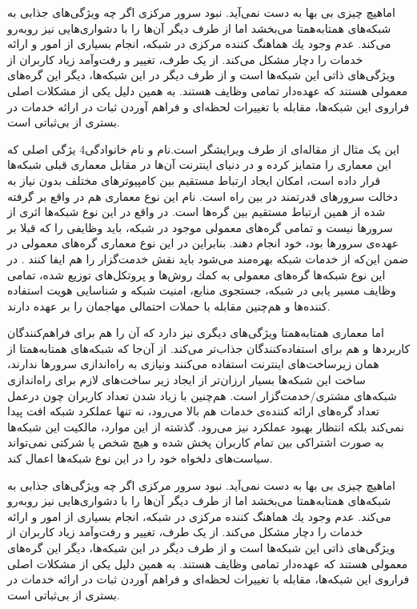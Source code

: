 \documentclass[12pt,twoside]{xepersian-magazine}
\begin{document}
\begin{article}{2}
اماهيچ چيزی بی‌ بها به دست نمی‌آید. نبود سرور مرکزی اگر چه  ويژگی‌های جذابی به شبکه‌های همتابه‌همتا می‌بخشد اما از طرف ديگر آن‌ها را با دشواری‌هايی نيز روبه‌رو می‌کند.  عدم وجود يك هماهنگ كننده مركزی در شبكه، انجام بسياری از امور و ارائه خدمات را  دچار مشكل می‌کند.  از يک طرف، تغيير و رفت‌وآمد زیاد کاربران از ويژگی‌های ذاتی اين شبکه‌ها است و از طرف ديگر در اين شبكه‌ها، ديگر اين گره‌های معمولی  هستند كه  عهده‌دار تمامی وظايف هستند. به همين دلیل يکی از مشکلات اصلی فراروی اين شبكه‌ها، مقابله با  تغييرات لحظه‌ای و فراهم آوردن ثبات در ارائه  خدمات در بستری از بی‌ثباتی است.  
\end{article}

\articlesep


\begin{editorial}{1}{این یک مثال از مقاله‌ای از طرف ویرایشگر است.}{نام و نام خانوادگی}{4}
يژگی اصلی که اين معماری را متمايز کرده و در دنيای اينترنت آن‌ها در مقابل معماری قبلی شبكه‌ها قرار داده است، امكان ايجاد ارتباط مستقيم  بين كامپيوترهای مختلف بدون نياز به دخالت سرورهای قدرتمند در بين راه است.  نام‌ اين نوع معماری هم در واقع بر گرفته شده از همین  ارتباط مستقیم بين گره‌ها است.  در واقع در اين نوع شبكه‌ها اثری از سرورها نيست و تمامی گره‌های معمولی موجود در شبكه، بايد وظايفی را که قبلا بر عهده‌ی سرورها بود، خود انجام دهند. بنابراين در اين نوع معماری گره‌های معمولی در ضمن اين‌که از خدمات شبکه بهره‌مند می‌شود بايد نقش خدمت‌گزار را هم ايفا کنند . در اين نوع شبکه‌ها گره‌های معمولی به كمك روش‌ها و پروتكل‌های توزيع شده، تمامی وظايف  مسير يابی در شبكه، جستجوی منابع، امنيت شبكه و شناسايی هويت استفاده كننده‌ها و هم‌چنين مقابله با حملات احتمالی مهاجمان را بر عهده دارند.

اما معماری همتابه‌همتا ويژگی‌های ديگری نيز دارد که آن را هم برای فراهم‌کنندگان کاربردها و هم برای استفاده‌کنندگان جذاب‌تر می‌کند.  از آن‌جا که شبکه‌های همتابه‌همتا از همان زيرساخت‌های اينترنت استفاده می‌کنند ونيازی به راه‌اندازی سرورها ندارند، ساخت اين شبكه‌ها بسيار ارزان‌تر از ايجاد زير ساخت‌های لازم برای راه‌اندازی شبكه‌های مشتری/خدمت‌گزار است.  هم‌چنين با زياد شدن تعداد کاربران چون درعمل تعداد گره‌های ارائه کننده‌ی خدمات هم بالا می‌رود، نه تنها عملكرد شبكه افت پيدا نمی‌كند بلكه انتظار بهبود عملکرد نيز می‌رود. گذشته از اين موارد، مالكيت اين شبكه‌ها به صورت اشتراكی بين تمام کاربران پخش شده و هيچ شخص يا شركتی نمی‌تواند سياست‌های دلخواه خود را در اين نوع شبكه‌ها اعمال کند.

اماهيچ چيزی بی‌ بها به دست نمی‌آید. نبود سرور مرکزی اگر چه  ويژگی‌های جذابی به شبکه‌های همتابه‌همتا می‌بخشد اما از طرف ديگر آن‌ها را با دشواری‌هايی نيز روبه‌رو می‌کند.  عدم وجود يك هماهنگ كننده مركزی در شبكه، انجام بسياری از امور و ارائه خدمات را  دچار مشكل می‌کند.  از يک طرف، تغيير و رفت‌وآمد زیاد کاربران از ويژگی‌های ذاتی اين شبکه‌ها است و از طرف ديگر در اين شبكه‌ها، ديگر اين گره‌های معمولی  هستند كه  عهده‌دار تمامی وظايف هستند. به همين دلیل يکی از مشکلات اصلی فراروی اين شبكه‌ها، مقابله با  تغييرات لحظه‌ای و فراهم آوردن ثبات در ارائه  خدمات در بستری از بی‌ثباتی است.
\end{editorial}
\end{document}

